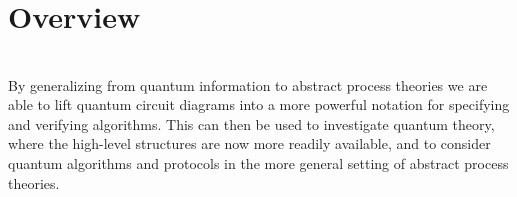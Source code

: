 \chapter{Overview}

\begin{align*}

\end{align*}

By generalizing from quantum information to abstract process theories we are able to lift quantum circuit diagrams into a more powerful notation for specifying and verifying algorithms.  This can then be used to investigate quantum theory, where the high-level structures are now more readily available, and to consider quantum algorithms and protocols in the more general setting of abstract process theories.
